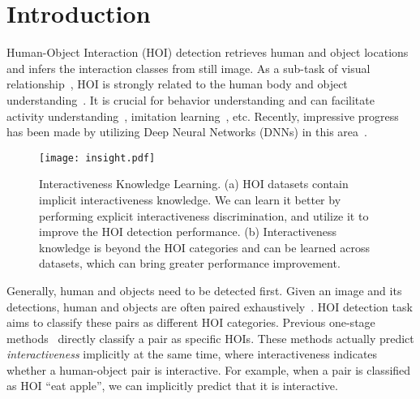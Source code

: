 \documentclass[10pt,twocolumn,letterpaper]{article}
\begin{document}
\section{Introduction}
Human-Object Interaction (HOI) detection retrieves human and object locations and infers the interaction classes from still image. As a sub-task of visual relationship~\cite{visualgenome,Lu2016Visual}, HOI is strongly related to the human body and object understanding~\cite{fang2018learning,xiu2018pose,fang2018weakly,faster-rcnn,lu2018beyond,maskrcnn,xu2018srda}. It is crucial for behavior understanding and can facilitate activity understanding~\cite{activitynet,deeprnn}, imitation learning~\cite{immitation}, etc. Recently, impressive progress has been made by utilizing Deep Neural Networks (DNNs) in this area~\cite{hicodet,Gkioxari2017Detecting,qi2018learning,gao2018ican}.
\begin{figure}[h]
	\begin{center}
		\texttt{[image: insight.pdf]}
	\end{center}
	\caption{Interactiveness Knowledge Learning. (a) HOI datasets contain implicit interactiveness knowledge. We can learn it better by performing explicit interactiveness discrimination, and utilize it to improve the HOI detection performance. (b) Interactiveness knowledge is beyond the HOI categories and can be learned across datasets, which can bring greater performance improvement.}
	\label{Figure:pipeline}
	\vspace{-0.3cm}
\end{figure}

Generally, human and objects need to be detected first. Given an image and its detections, human and objects are often paired exhaustively~\cite{Gkioxari2017Detecting,gao2018ican,qi2018learning}. HOI detection task aims to classify these pairs as different HOI categories. Previous one-stage methods~\cite{hicodet,Gkioxari2017Detecting,gao2018ican,vcoco,qi2018learning} directly classify a pair as specific HOIs. These methods actually predict \emph{interactiveness} implicitly at the same time, where interactiveness indicates whether a human-object pair is interactive. For example, when a pair is classified as HOI ``eat apple'', we can implicitly predict that it is interactive. 
\end{document}
